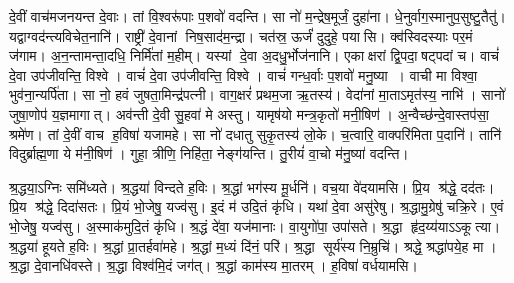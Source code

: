 दे॒वीं वाच॑मजनयन्त दे॒वाः। तां वि॒श्वरू॑पाः प॒शवो॑ वदन्ति।
सा नो॑ म॒न्द्रेष॒मूर्जं॒ दुहा॑ना। धे॒नुर्वाग॒स्मानुप॒सुष्टु॒तैतु॑।
यद्वाग्वद॑न्त्यविचेत॒नानि॑। राष्ट्री॑ दे॒वानां निष॒साद॑म॒न्द्रा।
चत॑स्र॒ ऊर्जं॑ दुदुहे॒ पयासि। क्व॑स्विदस्याः पर॒मं ज॑गाम।
अ॒न॒न्तामन्ता॒दधि॒ निर्मि॑तां म॒हीम्। यस्यां दे॒वा अ॒दधु॒र्भोज॑नानि।
एकाक्षरां द्वि॒पदा॒षट्पदां च। वाचं॑ दे॒वा उप॑जीवन्ति॒ विश्वे।
वाचं॑ दे॒वा उप॑जीवन्ति॒ विश्वे। वाचं॑ गन्ध॒र्वाः प॒शवो॑ मनु॒ष्या।
वाची मा विश्वा॒ भुव॑ना॒न्यर्पि॑ता। सा नो॒ हवं जुषता॒मिन्द्र॑पत्नी।
वाग॒क्षरं॑ प्रथम॒जा ऋ॒तस्य॑। वेदा॑नां मा॒ताऽमृत॑स्य॒ नाभि॑।
सानो॑ जुषा॒णोप॑ य॒ज्ञमागात्। अव॑न्ती दे॒वी सु॒हवा॑ मे अस्तु।
यामृष॑यो मन्त्र॒कृतो॑ मनी॒षिण॑। अ॒न्वैच्छ॑न्दे॒वास्तप॑सा॒ श्रमे॑ण।
तां दे॒वीं वाच ह॒विषा॑ यजामहे। सा नो॑ दधातु सुकृ॒तस्य॑ लो॒के।
च॒त्वारि॒ वाक्परि॑मिता प॒दानि॑। तानि॑ विदुर्ब्राह्म॒णा ये म॑नी॒षिण॑।
गुहा॒ त्रीणि॒ निहि॑ता॒ नेङ्ग॑यन्ति। तु॒रीयं॑ वा॒चो म॑नु॒ष्या॑ वदन्ति।

श्र॒द्धया॒ऽग्निः समि॑ध्यते। श्र॒द्धया॑ विन्दते ह॒विः।
श्र॒द्धां भग॑स्य मू॒र्धनि॑। वच॒या वे॑दयामसि।
प्रि॒य श्र॑द्धे॒ दद॑तः। प्रि॒य श्र॑द्धे॒ दिदा॑सतः।
प्रि॒यं भो॒जेषु॒ यज्व॑सु। इ॒दं म॑ उदि॒तं कृ॑धि।
यथा॑ दे॒वा असु॑रेषु। श्र॒द्धामु॒ग्रेषु॑ चक्रि॒रे।
ए॒वं भो॒जेषु॒ यज्व॑सु। अ॒स्माक॑मुदि॒तं कृ॑धि।
श्र॒द्धं दे॑वा॒ यज॑मानाः। वा॒युगो॑पा॒ उपा॑सते।
श्र॒द्धा हृ॑द॒य्य॑याऽऽकूत्या। श्र॒द्धया॑ हूयते ह॒विः।
श्र॒द्धां प्रा॒तर्हवा॑महे। श्र॒द्धां म॒ध्यं दि॑नं॒ परि॑।
श्र॒द्धा सूर्य॑स्य नि॒म्रुचि॑। श्रद्धे॒ श्रद्धा॑पये॒ह मा।
श्र॒द्धा दे॒वानधि॑वस्ते। श्र॒द्धा विश्व॑मि॒दं जग॑त्।
श्र॒द्धां काम॑स्य मा॒तरम्। ह॒विषा॑ वर्धयामसि।


